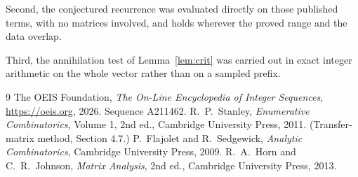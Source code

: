 \documentclass[11pt,a4paper]{article}
\theoremstyle{plain}
\theoremstyle{definition}
\begin{document}
Second, the conjectured recurrence was evaluated directly on those published terms, with no
matrices involved, and holds wherever the proved range and the data overlap.

Third, the annihilation test of Lemma~\ref{lem:crit} was carried out in exact integer
arithmetic on the whole vector rather than on a sampled prefix.

\begin{thebibliography}{9}
 The OEIS Foundation, \emph{The On-Line Encyclopedia of Integer
Sequences}, \url{https://oeis.org}, 2026. Sequence A211462.
 R.~P.~Stanley, \emph{Enumerative Combinatorics}, Volume 1, 2nd ed.,
Cambridge University Press, 2011. (Transfer-matrix method, Section 4.7.)
 P.~Flajolet and R.~Sedgewick, \emph{Analytic Combinatorics}, Cambridge
University Press, 2009.
 R.~A.~Horn and C.~R.~Johnson, \emph{Matrix Analysis}, 2nd ed., Cambridge
University Press, 2013.
\end{thebibliography}
\end{document}
